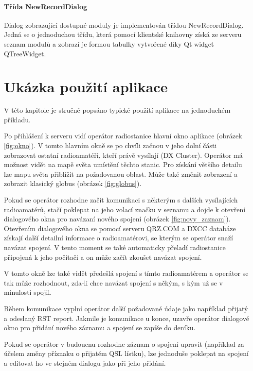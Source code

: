 \subsubsection{Třída NewRecordDialog}

Dialog zobrazující dostupné moduly je implementován třídou NewRecordDialog. Jedná se o jednoduchou třídu, která pomocí
klientské knihovny získá ze serveru seznam modulů a zobrazí je formou tabulky vytvořené díky Qt widget QTreeWidget.

\chapter{Ukázka použití aplikace}

V této kapitole je stručně popsáno typické použití aplikace na jednoduchém příkladu.

Po přihlášení k serveru vidí operátor radiostanice hlavní okno aplikace (obrázek \ref{fig:okno}).
V tomto hlavním okně se po chvíli začnou v jeho dolní části zobrazovat ostatní radioamatéři, kteří
právě vysílají (DX Cluster). Operátor má možnost vidět na mapě světa umístění těchto stanic. Pro získání většího 
detailu lze mapu světa přiblížit na požadovanou oblast. Může také změnit zobrazení a zobrazit klasický
globus (obrázek \ref{fig:globus}).

Pokud se operátor rozhodne začít komunikaci s některým s dalších vysílajících radioamatérů, stačí
poklepat na jeho volací značku v seznamu a dojde k otevření dialogového okna pro navázaní nového spojení (obrázek \ref{fig:novy_zaznam}).
Otevřením dialogového okna se pomocí serveru QRZ.COM a DXCC databáze získají další detailní informace o radioamatérovi, se kterým 
se operátor snaží navázat spojení. V tento moment se také automaticky přeladí radiostanice připojená
k jeho počítači a on může začít zkoušet navázat spojení.

V tomto okně lze také vidět předešlá spojení s tímto radioamatérem a operátor se tak může rozhodnout, zda-li chce
navázat spojení s někým, s kým už se v minulosti spojil.

Během komunikace vyplní operátor další požadované údaje jako například přijatý a odeslaný RST report. Jakmile je komunikace
u konce, uzavře operátor dialogové okno pro přidání nového záznamu a spojení se zapíše do deníku.

Pokud se operátor v budoucnu rozhodne záznam o spojení upravit (například za účelem změny příznaku o 
přijatém QSL lístku), lze jednoduše poklepat na spojení a editovat ho ve stejném dialogu jako při jeho
přidání.

